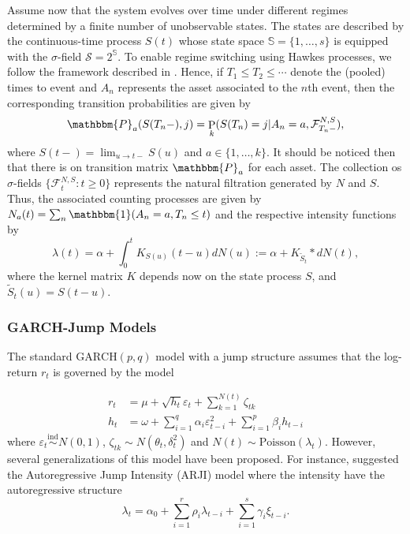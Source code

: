 \documentclass[11pt]{article}
\DeclareMathOperator{\Prob}{P}
\let\oldmarginpar\marginpar
\renewcommand{\marginpar}[2][rectangle,draw,fill=white, text=red,text width= 3cm]{
    \oldmarginpar{
    \scriptsize \tikz \node at (0,0) [#1]{#2};}
    }
\begin{document}
Assume now that the system evolves over time under different regimes determined by a finite number of unobservable states. The states are described by the continuous-time process \(S(t)\) whose state space \(\mathbb{S}=\{1,\dots,s\}\) is equipped with the \(\sigma\)-field \(\mathcal{S}=2^\mathbb{S}\). To enable regime switching using Hawkes processes, we follow the framework described in \cite{patrichi-2022}. Hence, if \(T_1\leq T_2\leq\cdots\) denote the (pooled) times to event and \(A_n\) represents the asset associated to the \(n\)th event, then the corresponding transition probabilities are given by
\begin{equation*}
\mathbbm{P}_{a}(S(T_n-),j)=\Prob_k(S(T_n)=j|A_n=a, \mathcal{F}_{T_n-}^{N,S}),
\end{equation*}
where \(\displaystyle S(t-)=\lim_{u\to t-}S(u)\) and \(a\in\{1,\dots,k\}\). It should be noticed then that there is on transition matrix \(\mathbbm{P}_a\) for each asset. The collection os \(\sigma\)-fields \(\{\mathcal{F}_t^{N,S}:t\geq0\}\) represents the natural filtration generated by \(N\) and \(S\). Thus, the associated counting processes are given by \(N_a(t)=\sum_n\mathbbm{1}(A_n=a,T_n\leq t)\) and the respective intensity functions by
\begin{equation*}
\lambda(t)
=\alpha+\int_0^tK_{S(u)}(t-u)dN(u)
:=\alpha+K_{\tilde S_t}*dN(t),
\end{equation*}
where the kernel matrix \(K\) depends now on the state process \(S\), and \(\tilde S_t(u)=S(t-u)\).

\subsubsection{GARCH-Jump Models}

The standard \(\text{GARCH}(p,q)\) model with a jump structure assumes that the log-return \(r_t\) is governed by the model\marginpar{\color{red}\tiny \'E razo\'avel considerar \(q=p=1\)?}
\begin{equation*}
\begin{split}
r_t&=\mu+\sqrt{h_t}\varepsilon_t+\sum_{k=1}^{N(t)}\zeta_{tk}\\
h_t&=\omega+\sum_{i=1}^q\alpha_i\varepsilon_{t-i}^2+\sum_{i=1}^p\beta_ih_{t-i}
\end{split}
\end{equation*}
where \(\varepsilon_t\stackrel{\text{ind}}{\sim}N(0,1)\), \(\zeta_{tk}\sim N(\theta_t,\delta_t^2)\) and \(N(t)\sim\text{Poisson}(\lambda_t)\). However, several generalizations of this model have been proposed. For instance, \cite{chan-2002} suggested the Autoregressive Jump Intensity (ARJI) model where the intensity have the autoregressive structure
\begin{equation*}
\lambda_t=\alpha_0+\sum_{i=1}^r\rho_i\lambda_{t-i}+\sum_{i=1}^s\gamma_i\xi_{t-i}.
\end{equation*}
\end{document}

